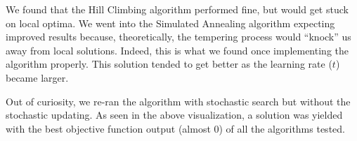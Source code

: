 \documentclass[11pt]{article}
\begin{document}
We found that the Hill Climbing algorithm performed fine, but would get
stuck on local optima. We went into the Simulated Annealing algorithm
expecting improved results because, theoretically, the tempering process
would ``knock'' us away from local solutions. Indeed, this is what we
found once implementing the algorithm properly. This solution tended to
get better as the learning rate (\(t\)) became larger.

Out of curiosity, we re-ran the algorithm with stochastic search but
without the stochastic updating. As seen in the above visualization, a
solution was yielded with the best objective function output (almost 0)
of all the algorithms tested.


    
    
    
\end{document}

